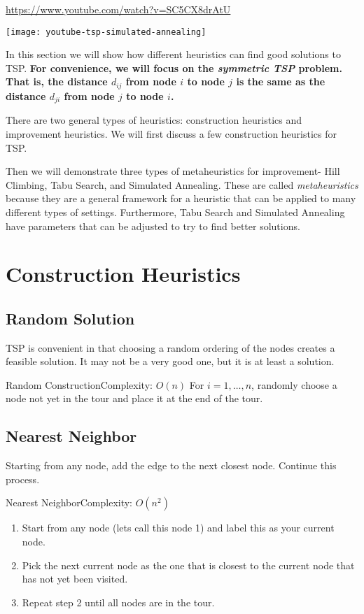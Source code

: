 

\url{https://www.youtube.com/watch?v=SC5CX8drAtU}

\texttt{[image: youtube-tsp-simulated-annealing]}

In this section we will show how different heuristics can find good solutions to TSP.  \textbf{ For convenience,  we will focus on the \emph{symmetric TSP} problem.  That is, the distance $d_{ij}$ from node $i$ to node $j$ is the same as the distance $d_{ji}$ from node $j$ to node $i$.}

There are two general types of heuristics: construction heuristics and improvement heuristics.  We will first discuss a few construction heuristics for TSP.


Then we will demonstrate three types of metaheuristics for improvement- Hill Climbing, Tabu Search, and Simulated Annealing.  These are called \emph{metaheuristics} because they are a general framework for a heuristic that can be applied to many different types of settings.  Furthermore, Tabu Search and Simulated Annealing have parameters that can be adjusted to try to find better solutions.  

\section{Construction Heuristics}
\subsection{Random Solution}
TSP is convenient in that choosing a random ordering of the nodes creates a feasible solution.  It may not be a very good one, but it is at least a solution.

\begin{general}{Random Construction}{Complexity: $O(n)$}
\label{heuristic:random}
For $i=1, \dots, n$, randomly choose a node not yet in the tour and place it at the end of the tour.
\end{general}

\subsection{Nearest Neighbor}
Starting from any node, add the edge to the next closest node.  Continue this process.
\begin{general}{Nearest Neighbor}{Complexity: $O(n^2)$}
\label{heuristic:nearestNeighbor}
\begin{enumerate}
\item Start from any node (lets call this node 1) and label this as your current node.
\item Pick the next current node as the one that is closest to the current node that has not yet been visited.
\item Repeat step 2 until all nodes are in the tour.
\end{enumerate}
\end{general}

